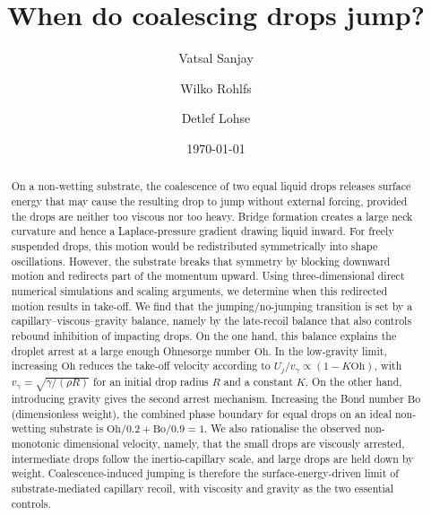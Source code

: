 \documentclass[
reprint,
amsmath,amssymb,
superscriptaddress,
onecolumn,
aps,
prfluids,
longbibliography,
floatfix
]{revtex4-2}
\newcommand{\Oh}{\mathrm{Oh}}
\newcommand{\Bo}{\mathrm{Bo}}
\newcommand{\vgamma}{v_\gamma}
\begin{document}
\title{When do coalescing drops jump?}

\author{Vatsal Sanjay}

\author{Wilko Rohlfs}

\author{Detlef Lohse}

\date{\today}

\begin{abstract}
On a non-wetting substrate, the coalescence of two equal liquid drops releases surface energy that may cause the resulting drop to jump without external forcing, provided the drops are neither too viscous nor too heavy. Bridge formation creates a large neck curvature and hence a Laplace-pressure gradient drawing liquid inward. For freely suspended drops, this motion would be redistributed symmetrically into shape oscillations. However, the substrate breaks that symmetry by blocking downward motion and redirects part of the momentum upward. Using three-dimensional direct numerical simulations and scaling arguments, we determine when this redirected motion results in take-off.
We find that the jumping/no-jumping transition is set by a capillary--viscous--gravity balance, namely by the late-recoil balance that also controls rebound inhibition of impacting drops. On the one hand, this balance explains the droplet arrest at a large enough Ohnesorge number $\Oh$. In the low-gravity limit, increasing $\Oh$ reduces the take-off velocity according to $U_j/\vgamma \propto (1-K\Oh)$, with $\vgamma=\sqrt{\gamma/(\rho R)}$ for an initial drop radius $R$ and a constant $K$. On the other hand, introducing gravity gives the second arrest mechanism.
Increasing the Bond number $\Bo$ (dimensionless weight), the combined phase boundary for equal drops on an ideal non-wetting substrate is $\Oh/0.2+\Bo/0.9=1$. We also rationalise the observed non-monotonic dimensional velocity, namely, that the small drops are viscously arrested, intermediate drops follow the inertio-capillary scale, and large drops are held down by weight. Coalescence-induced jumping is therefore the surface-energy-driven limit of substrate-mediated capillary recoil, with viscosity and gravity as the two essential controls.
\end{abstract}
\end{document}
